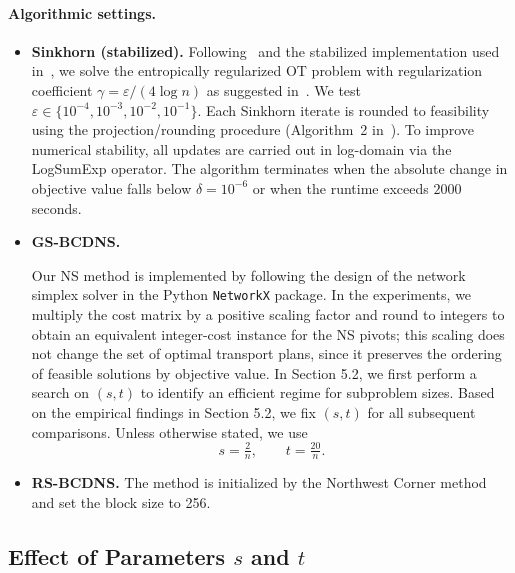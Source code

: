 \documentclass[12pt,a4paper]{article}
\begin{document}
\paragraph{Algorithmic settings.}
\begin{itemize}

  \item \textbf{Sinkhorn (stabilized).}
  Following~\cite{cuturi2013sinkhorn} and the stabilized implementation used in~\cite{xie2023randomized},
  we solve the entropically regularized OT problem with regularization coefficient
  $\gamma = \varepsilon/(4\log n)$ as suggested in~\cite{dvurechensky2018computational}.
  We test $\varepsilon \in \{10^{-4},10^{-3},10^{-2},10^{-1}\}$.
  Each Sinkhorn iterate is rounded to feasibility using the projection/rounding procedure
  (Algorithm~2 in~\cite{altschuler2017near}).
  To improve numerical stability, all updates are carried out in log-domain via the LogSumExp
  operator.
  The algorithm terminates when the absolute change in objective value falls below
  $\delta = 10^{-6}$ or when the runtime exceeds $2000$ seconds.

  \item \textbf{GS-BCDNS.}
  
    Our NS method is implemented by following the design of the
    network simplex solver in the Python \texttt{NetworkX} package.
    In the experiments, we multiply the cost matrix by a positive scaling factor and round to integers
    to obtain an equivalent integer-cost instance for the NS pivots; this scaling does not change the
    set of optimal transport plans, since it preserves the ordering of feasible solutions by objective value.
    In Section 5.2, we first perform a search on $(s,t)$ to identify an efficient regime for subproblem sizes.
    Based on the empirical findings in Section 5.2, we fix $(s,t)$ for all subsequent comparisons.
    Unless otherwise stated, we use
    \[
      s=\tfrac{2}{n}, \qquad t=\tfrac{20}{n}.
    \]



  \item \textbf{RS-BCDNS.}
  The method is initialized by the Northwest Corner method and set the block size to 256.

\end{itemize}





\subsection{Effect of Parameters $s$ and $t$}\label{sec:st-effect}
\end{document}
